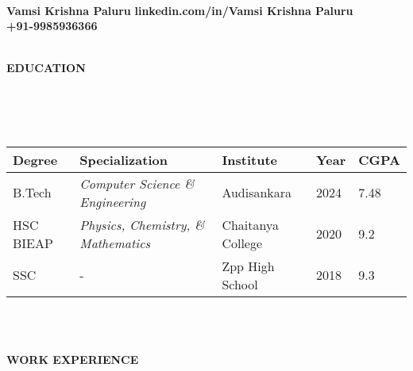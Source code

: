 \documentclass[a4paper,10pt]{article}
\newcommand{\lsep}{-0.5cm}
\newcommand{\resheading}[1]{{\small \colorbox{mygrey}{\begin{minipage}{0.975\textwidth}{\textbf{#1 \vphantom{p\^{E}}}}\end{minipage}}}}
\begin{document}
\hspace{0.5cm}\\[-1.8cm]

\textbf{Vamsi Krishna Paluru} \hspace{7.3cm} {\bf linkedin.com/in/Vamsi Krishna Paluru }\\
  \hspace{8.9 cm} {\bf +91-9985936366 } \\
\indent {\bf }  \hspace{8.0 cm} {\bf } \\

\vspace{-8mm}
\resheading{\textbf{EDUCATION} }\\[\lsep]\\ \\
\indent \begin{tabular}{ p{2.5cm} @{\hskip 0.15in} p{5.5cm} @{\hskip 0.15in} p{3.5cm} @{\hskip 0.15in} p{2.5cm} @{\hskip 0.15in} p{1.5cm} }
\toprule
\textbf{Degree} & \textbf{Specialization} & \textbf{Institute} & \textbf{Year} & \textbf{CGPA} \\
\midrule
B.Tech & \textit{Computer Science \& Engineering} & Audisankara & 2024 & 7.48 \\
HSC BIEAP & \textit{Physics, Chemistry, \& Mathematics} & Chaitanya College & 2020 & 9.2\\
SSC  & - & Zpp High School & 2018 & 9.3\\
\bottomrule
\end{tabular}

\\ \\


\vspace{1mm}

\resheading{\textbf{WORK EXPERIENCE} }
\end{document}
